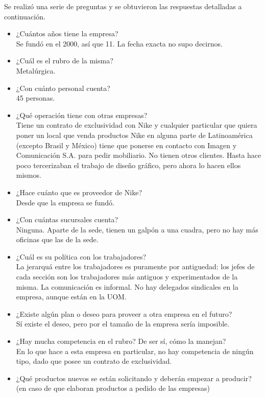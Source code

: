 \documentclass[a4paper,10pt,titlepage]{article}
\begin{document}
Se realiz\'o una serie de preguntas y se obtuvieron las respuestas detalladas a continuaci\'on.

\begin{itemize}

\item ¿Cu\'antos a\~nos tiene la empresa? \\
Se fund\'o en el 2000, as\'i que 11. La fecha exacta no supo decirnos.
\item ¿Cu\'al es el rubro de la misma? \\
Metal\'urgica.
\item ¿Con cu\'anto personal cuenta? \\
45 personas.
\item ¿Qu\'e operaci\'on tiene con otras empresas? \\
Tiene un contrato de exclusividad con Nike y cualquier particular que quiera poner un local que venda productos Nike 
en alguna parte de Latinoam\'erica (excepto Brasil y M\'exico) tiene que ponerse en contacto con Imagen y Comunicaci\'on S.A. 
para pedir mobiliario. No tienen otros clientes. Hasta hace poco tercerizaban el trabajo de diseño gr\'afico, pero ahora lo hacen ellos mismos.
\item ¿Hace cu\'anto que es proveedor de Nike? \\
Desde que la empresa se fund\'o.
\item ¿Con cu\'antas sucursales cuenta? \\
Ninguna. Aparte de la sede, tienen un galp\'on a una cuadra, pero no hay m\'as oficinas que las de la sede.
\item ¿Cu\'al es su pol\'itica con los trabajadores? \\
La jerarqu\'a entre los trabajadores es puramente por antiguedad: los jefes de cada secci\'on son los trabajadores m\'as antiguos
 y experimentados de la misma. La comunicaci\'on es informal. No hay delegados sindicales en la empresa, aunque est\'an en la UOM.
\item ¿Existe alg\'un plan o deseo para proveer a otra empresa en el futuro? \\
S\'i existe el deseo, pero por el tamaño de la empresa ser\'ia imposible.
\item ¿Hay mucha competencia en el rubro? De ser s\'i, c\'omo la manejan? \\
En lo que hace a esta empresa en particular, no hay competencia de ning\'un tipo, dado que posee un contrato de exclusividad.
\item ¿Qu\'e productos nuevos se est\'an solicitando y deber\'an empezar a producir? (en caso de que elaboran productos a pedido de las empresas) \\

\end{itemize}
\end{document}

